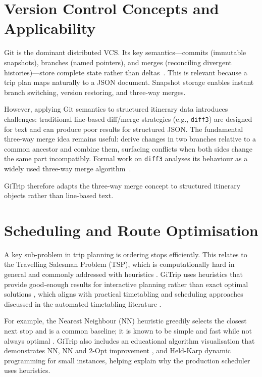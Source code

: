 \section{Version Control Concepts and Applicability}
Git is the dominant distributed VCS. Its key semantics---commits (immutable snapshots), branches (named pointers), and merges (reconciling divergent histories)---store complete state rather than deltas~\cite{ref_progit_snapshots}. This is relevant because a trip plan maps naturally to a JSON document. Snapshot storage enables instant branch switching, version restoring, and three-way merges.

However, applying Git semantics to structured itinerary data introduces
challenges: traditional line-based diff/merge strategies (e.g., \texttt{diff3})
are designed for text and can produce poor results for structured JSON. The
fundamental three-way merge idea remains useful: derive changes in two branches
relative to a common ancestor and combine them, surfacing conflicts when both
sides change the same part incompatibly. Formal work on \texttt{diff3} analyses
its behaviour as a widely used three-way merge algorithm~\cite{ref_diff3_paper}.

GiTrip therefore adapts the three-way merge concept to structured itinerary
objects rather than line-based text.

\section{Scheduling and Route Optimisation}
A key sub-problem in trip planning is ordering stops efficiently. This relates to
the Travelling Salesman Problem (TSP), which is computationally hard in general
and commonly addressed with heuristics
\cite{ref_tsp_study}. GiTrip uses heuristics that provide
good-enough results for interactive planning rather than exact optimal solutions
\cite{ref_tsp_local_search},
which aligns with practical timetabling and scheduling approaches discussed in
the automated timetabling literature \cite{ref_patat}.

For example, the Nearest Neighbour (NN) heuristic greedily selects the closest
next stop and is a common baseline; it is known to be simple and fast while not
always optimal \cite{ref_nn_tsp}. GiTrip also includes an educational algorithm
visualisation that demonstrates NN, NN and 2-Opt improvement
\cite{ref_nn_2opt_hybrid}, and Held-Karp
dynamic programming for small instances, helping explain why the production
scheduler uses heuristics.

